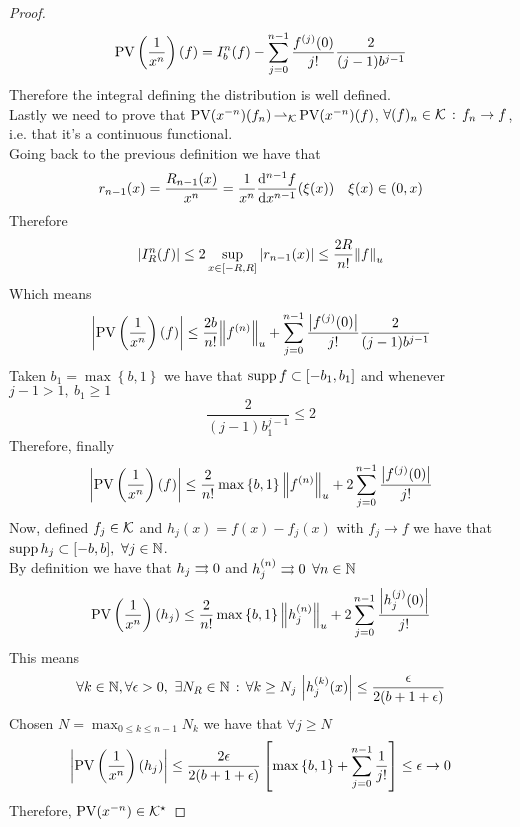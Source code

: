 \documentclass[../complete.tex]{subfiles}
\begin{document}
\begin{proof}
	\begin{equation*}
		\operatorname{\mathrm{PV}}\left( \frac{1}{x^n} \right)(f)=I_b^n(f)-\sum_{j=0}^{n-1}\frac{f^{(j)}(0)}{j!}\frac{2}{(j-1)b^{j-1}}
	\end{equation*}
	Therefore the integral defining the distribution is well defined.\\
	Lastly we need to prove that $\mathrm{PV}(x^{-n})(f_n)\operatorname{\rightharpoonup_{\mathcal{K}}}\mathrm{PV}(x^{-n})(f)$, $\forall(f)_n\in\mathcal{K}\, :\,  f_n\to f$, i.e. that it's a continuous functional.\\
	Going back to the previous definition we have that
	\begin{equation*}
		r_{n-1}(x)=\frac{R_{n-1}(x)}{x^n}=\frac{1}{x^n}\derivative[n-1]{f}{x}{(\xi(x))}\quad\xi(x)\in(0,x)
	\end{equation*}
	Therefore
	\begin{equation*}
		\abs{I^n_R(f)}\le2\sup_{x\in[-R,R]}\abs{r_{n-1}(x)}\le\frac{2R}{n!}\norm{f}_u
	\end{equation*}
	Which means
	\begin{equation*}
		\abs{\mathrm{PV}\left( \frac{1}{x^{n}} \right)(f)}\le\frac{2b}{n!}\norm{f^{(n)}}_u+\sum_{j=0}^{n-1}\frac{\abs{f^{(j)}(0)}}{j!}\frac{2}{(j-1)b^{j-1}}
	\end{equation*}
	Taken $b_1=\max\left\{ b,1 \right\}$ we have that $\operatorname{supp} f\subset[-b_1,b_1]$ and whenever $j-1>1,\ b_1\ge1$
	\begin{equation*}
		\frac{2}{(j-1)b_1^{j-1}}\le2
	\end{equation*}
	Therefore, finally
	\begin{equation*}
		\abs{\mathrm{PV}\left( \frac{1}{x^{n}} \right)(f)}\le\frac{2}{n!}\max\left\{ b,1 \right\}\norm{f^{(n)}}_u+2\sum_{j=0}^{n-1}\frac{\abs{f^{(j)}(0)}}{j!}
	\end{equation*}
	Now, defined $f_j\in\mathcal{K}$ and $h_j(x)=f(x)-f_j(x)$ with $f_j\to f$ we have that $\operatorname{supp} h_j\subset[-b,b],\ \forall j\in\mathbb{N}$.\\
	By definition we have that $h_j\rightrightarrows0$ and $h^{(n)}_j\rightrightarrows0$ $\forall n\in\mathbb{N}$
	\begin{equation*}
		\mathrm{PV}\left( \frac{1}{x^{n}} \right)(h_j)\le\frac{2}{n!}\max\left\{ b,1 \right\}\norm{h_j^{(n)}}_u+2\sum_{j=0}^{n-1}\frac{\abs{h_j^{(j)}(0)}}{j!}
	\end{equation*}
	This means
	\begin{equation*}
		\forall k\in\N,\forall\epsilon>0,\ \exists N_R\in\N\st\forall k\ge N_j\ \abs{h_j^{(k)}(x)}\le\frac{\epsilon}{2(b+1+\epsilon)}
	\end{equation*}
	Chosen $N=\max_{0\le k\le n-1}N_k$ we have that $\forall j\ge N$
	\begin{equation*}
		\abs{\mathrm{PV}\left( \frac{1}{x^{n}} \right)(h_j)}\le\frac{2\epsilon}{2(b+1+\epsilon)}\left[ \max\left\{ b,1 \right\}+\sum_{j=0}^{n-1}\frac{1}{j!} \right]\le\epsilon\to0
	\end{equation*}
	Therefore, $\mathrm{PV}(x^{-n})\in\mathcal{K}^\star$
\end{proof}
\end{document}
